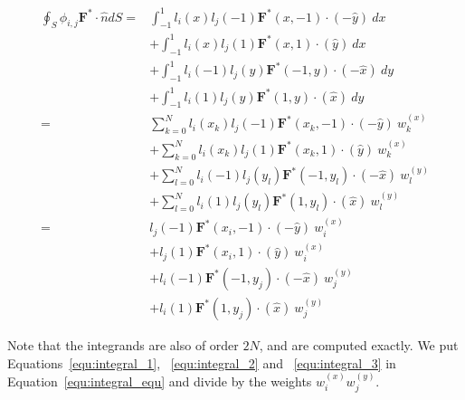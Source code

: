 \begin{equation} \label{equ:integral_2}
	\begin{split}
        \oint_{S} \phi_{i, j}\mathbf{F}^* \cdot \widehat{n}dS = & 
        \int_{-1}^{1}l_i(x) l_j(-1)\mathbf{F}^*(x, -1) \cdot (-\widehat{y}) \: dx \\
        & + \int_{-1}^{1}l_i(x) l_j(1)\mathbf{F}^*(x, 1) \cdot (\widehat{y}) \: dx \\
        & + \int_{-1}^{1}l_i(-1) l_j(y)\mathbf{F}^*(-1, y) \cdot (-\widehat{x}) \: dy \\
        & + \int_{-1}^{1}l_i(1) l_j(y)\mathbf{F}^*(1, y) \cdot (\widehat{x}) \: dy \\
        = & \sum_{k = 0}^{N}l_i(x_k)l_j(-1)\mathbf{F}^*(x_k, -1)\cdot (-\widehat{y}) \: w_k^{(x)} \\
        & + \sum_{k = 0}^{N}l_i(x_k)l_j(1)\mathbf{F}^*(x_k, 1)\cdot (\widehat{y}) \: w_k^{(x)} \\
        & + \sum_{l = 0}^{N}l_i(-1)l_j(y_l)\mathbf{F}^*(-1, y_l)\cdot (-\widehat{x}) \: w_l^{(y)} \\
        & + \sum_{l = 0}^{N}l_i(1)l_j(y_l)\mathbf{F}^*(1, y_l)\cdot (\widehat{x}) \: w_l^{(y)} \\
        = & l_j(-1)\mathbf{F}^*(x_i, -1)\cdot (-\widehat{y}) \: w_i^{(x)} \\
        & + l_j(1)\mathbf{F}^*(x_i, 1)\cdot (\widehat{y}) \: w_i^{(x)} \\
        & + l_i(-1)\mathbf{F}^*(-1, y_j)\cdot (-\widehat{x}) \: w_j^{(y)} \\
        & + l_i(1)\mathbf{F}^*(1, y_j)\cdot (\widehat{x}) \: w_j^{(y)}
	\end{split}
\end{equation}

Note that the integrands are also of order $2 N$, and are computed exactly. We put
Equations~\ref{equ:integral_1}, ~\ref{equ:integral_2} and ~\ref{equ:integral_3} in
Equation~\ref{equ:integral_equ} and divide by the weights $w_i^{ \left( x \right) } w_j^{ \left( y \right) }$.

